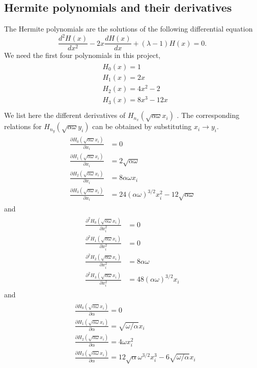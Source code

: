 \documentclass[english, a4paper]{article}
\begin{document}
\subsection{Hermite polynomials and their derivatives} \label{app:appendixA3}
The Hermite polynomials are the solutions of the following differential
equation
\begin{equation}
   \frac{d^2H(x)}{dx^2}-2x\frac{dH(x)}{dx}+(\lambda-1)H(x)=0.
   \label{eq:hermite}
\end{equation}
We need the first four polynomials in this project,
\begin{align}
\begin{split}
   &H_0(x)=1 \\
   &H_1(x)=2x \\
   &H_2(x)=4x^2-2 \\
   &H_3(x)=8x^3-12x \\
   \label{hermite}
\end{split}
\end{align}
We list here the different derivatives of $H_{n_x}(\sqrt{\alpha\omega} x_i)$ .
The corresponding relations for $H_{n_y}(\sqrt{\alpha\omega} y_i)$ can be obtained by
substituting $x_i \rightarrow y_i$. 
\begin{align}
\begin{split}
\frac{\partial H_0(\sqrt{\alpha\omega} x_i)}{\partial x_i} &= 0 \\
\frac{\partial H_1(\sqrt{\alpha\omega} x_i)}{\partial x_i} &= 2\sqrt{\alpha\omega} \\
\frac{\partial H_2(\sqrt{\alpha\omega} x_i)}{\partial x_i} &= 8\alpha\omega x_i \\
\frac{\partial H_3(\sqrt{\alpha\omega} x_i)}{\partial x_i} &= 24(\alpha\omega)^{3/2}x_i^2 - 12\sqrt{\alpha\omega}
\end{split}
\end{align}
and 
\begin{align}
\begin{split}
\frac{\partial^2 H_0(\sqrt{\alpha\omega} x_i)}{\partial x_i^2} &= 0 \\
\frac{\partial^2 H_1(\sqrt{\alpha\omega} x_i)}{\partial x_i^2} &= 0 \\
\frac{\partial^2 H_2(\sqrt{\alpha\omega} x_i)}{\partial x_i^2} &= 8\alpha\omega \\
\frac{\partial^2 H_3(\sqrt{\alpha\omega} x_i)}{\partial x_i^2} &= 48(\alpha\omega)^{3/2}x_i
\end{split}
\end{align}
and 
\begin{align}
\begin{split}
&\frac{\partial H_0(\sqrt{\alpha\omega} x_i)}{\partial \alpha} = 0 \\
&\frac{\partial H_1(\sqrt{\alpha\omega} x_i)}{\partial \alpha} = \sqrt{\omega/\alpha}x_i \\
&\frac{\partial H_2(\sqrt{\alpha\omega} x_i)}{\partial \alpha} = 4\omega x_i^2 \\
&\frac{\partial H_3(\sqrt{\alpha\omega} x_i)}{\partial \alpha} = 12 \sqrt{\alpha}\omega^{3/2} x_i^3
 - 6 \sqrt{\omega/\alpha}x_i
\end{split}
\end{align}
\end{document}
